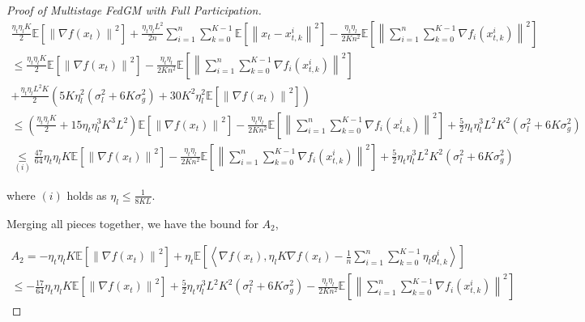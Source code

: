\begin{proof}[Proof of Multistage FedGM with Full Participation]
\begin{equation}
\begin{gathered}
\frac{\eta_t \eta_l K}{2}\mathbb{E}\left[\left\|\nabla f(x_t)\right\|^2\right] + \frac{\eta_t\eta_l L^2}{2 n} \sum_{i=1}^n\sum_{k=0}^{K-1} \mathbb{E}\left[\left\|  x_t - x_{t,k}^i \right\|^2\right] - \frac{\eta_t\eta_l}{2Kn^2}\mathbb{E}\left[\left\| \sum_{i=1}^n\sum_{k=0}^{K-1}\nabla f_i(x_{t,k}^i)\right\|^2\right]\\
\leq \frac{\eta_t \eta_l K}{2}\mathbb{E}\left[\left\|\nabla f(x_t)\right\|^2\right] - \frac{\eta_t\eta_l}{2Kn^2}\mathbb{E}\left[\left\| \sum_{i=1}^n\sum_{k=0}^{K-1}\nabla f_i(x_{t,k}^i)\right\|^2\right]\\
+ \frac{\eta_t\eta_l L^2 K}{2} \left( 5K\eta_l^2\left(\sigma_l^2+6K\sigma_g^2\right)+30 K^2 \eta_l^2\mathbb{E}\left[\left\|\nabla f(x_t)\right\|^2\right] \right) \\
\leq \left(\frac{\eta_t \eta_l K}{2}+15 \eta_t \eta_l^3 K^3  L^2  \right) \mathbb{E}\left[\left\|\nabla f(x_t)\right\|^2\right] - \frac{\eta_t\eta_l}{2Kn^2}\mathbb{E}\left[\left\| \sum_{i=1}^n\sum_{k=0}^{K-1}\nabla f_i(x_{t,k}^i)\right\|^2\right] + \frac{5}{2}\eta_t\eta_l^3L^2K^2\left(\sigma_l^2+6K\sigma_g^2\right) \\
\underset{(i)}{\leq} \frac{47}{64}\eta_t \eta_l K \mathbb{E}\left[\left\|\nabla f(x_t)\right\|^2\right] - \frac{\eta_t\eta_l}{2Kn^2}\mathbb{E}\left[\left\| \sum_{i=1}^n\sum_{k=0}^{K-1}\nabla f_i(x_{t,k}^i)\right\|^2\right] + \frac{5}{2}\eta_t\eta_l^3L^2K^2\left(\sigma_l^2+6K\sigma_g^2\right)
\end{gathered}\nonumber
\end{equation}

where $(i)$ holds as $\eta_l\le\frac{1}{8KL}$.

Merging all pieces together, we have the bound for $A_2$,

\begin{equation}
\begin{gathered}
A_2 = -\eta_t \eta_l K \mathbb{E}\left[\left\|\nabla f(x_t) \right\|^2\right] + \eta_t\mathbb{E}\left[\left\langle \nabla f(x_t), \eta_l K \nabla f(x_t) - \frac{1}{n}\sum_{i=1}^n\sum_{k=0}^{K-1}\eta_l g_{t,k}^i \right\rangle\right]\\
\leq -\frac{17}{64}\eta_t \eta_l K \mathbb{E}\left[\left\|\nabla f(x_t) \right\|^2\right] + \frac{5}{2}\eta_t\eta_l^3L^2K^2\left(\sigma_l^2+6K\sigma_g^2\right)
-\frac{\eta_t\eta_l}{2Kn^2} \mathbb{E}\left[\left\| \sum_{i=1}^n\sum_{k=0}^{K-1} \nabla f_i(x_{t,k}^i)\right\|^2\right]
\end{gathered}\nonumber
\end{equation}



\end{proof}
